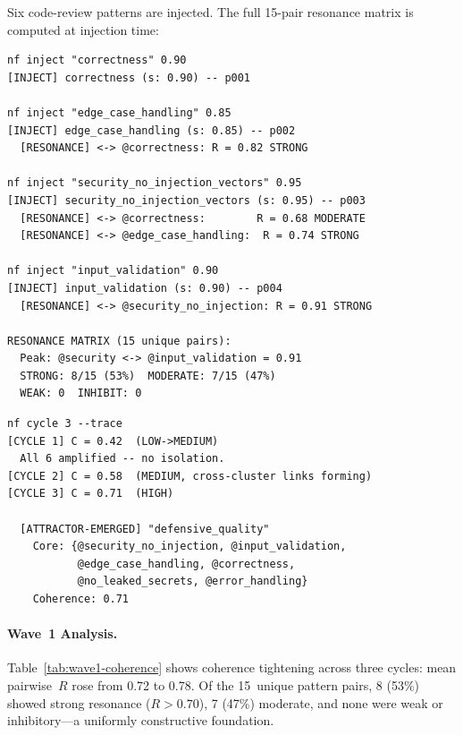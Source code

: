 Six code-review patterns are injected.  The full 15-pair resonance
matrix is computed at injection time:

\begin{terminalbox}
\begin{lstlisting}[style=neosshell]
nf inject "correctness" 0.90
[INJECT] correctness (s: 0.90) -- p001

nf inject "edge_case_handling" 0.85
[INJECT] edge_case_handling (s: 0.85) -- p002
  [RESONANCE] <-> @correctness: R = 0.82 STRONG

nf inject "security_no_injection_vectors" 0.95
[INJECT] security_no_injection_vectors (s: 0.95) -- p003
  [RESONANCE] <-> @correctness:        R = 0.68 MODERATE
  [RESONANCE] <-> @edge_case_handling:  R = 0.74 STRONG

nf inject "input_validation" 0.90
[INJECT] input_validation (s: 0.90) -- p004
  [RESONANCE] <-> @security_no_injection: R = 0.91 STRONG

RESONANCE MATRIX (15 unique pairs):
  Peak: @security <-> @input_validation = 0.91
  STRONG: 8/15 (53%)  MODERATE: 7/15 (47%)
  WEAK: 0  INHIBIT: 0
\end{lstlisting}
\end{terminalbox}

\begin{terminalbox}
\begin{lstlisting}[style=neosshell]
nf cycle 3 --trace
[CYCLE 1] C = 0.42  (LOW->MEDIUM)
  All 6 amplified -- no isolation.
[CYCLE 2] C = 0.58  (MEDIUM, cross-cluster links forming)
[CYCLE 3] C = 0.71  (HIGH)

  [ATTRACTOR-EMERGED] "defensive_quality"
    Core: {@security_no_injection, @input_validation,
           @edge_case_handling, @correctness,
           @no_leaked_secrets, @error_handling}
    Coherence: 0.71
\end{lstlisting}
\end{terminalbox}

\paragraph*{Wave~1 Analysis.}

Table~\ref{tab:wave1-coherence} shows coherence tightening across
three cycles: mean pairwise~$R$ rose from 0.72 to 0.78.  Of the
15~unique pattern pairs, 8 (53\%) showed strong resonance
($R > 0.70$), 7 (47\%) moderate, and none were weak or
inhibitory---a uniformly constructive foundation.

